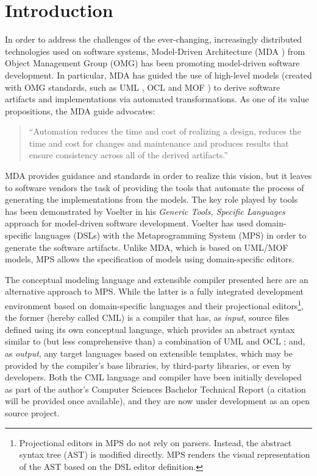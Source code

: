 \section{Introduction}
%
In order to address the challenges of the ever-changing,
increasingly distributed technologies used on software systems,
Model-Driven Architecture (MDA \cite{mda}) from Object Management Group (OMG)
has been promoting model-driven software development.
In particular, MDA has guided the use of high-level models (created with OMG standards,
such as UML \cite{uml}, OCL \cite{ocl} and MOF \cite{mof}) to derive software artifacts and implementations via automated transformations.
As one of its value propositions, the MDA guide \cite{mda} advocates:

\begin{quote}``Automation reduces the time and cost of realizing a design,
reduces the time and cost for changes and maintenance and produces results that ensure consistency across all of the derived artifacts.''\end{quote}

MDA provides guidance and standards in order to realize this vision,
but it leaves to software vendors the task of providing the tools that automate the process of generating the implementations from the models.
The key role played by tools has been demonstrated by Voelter \cite{voelter} in his \emph{Generic Tools, Specific Languages} approach for model-driven software development.
Voelter \cite{voelter} has used domain-specific languages (DSLs) with the Metaprogramming System (MPS) in order to generate the software artifacts.
Unlike MDA, which is based on UML/MOF models,
MPS allows the specification of models using domain-specific editors.

The conceptual modeling language and extensible compiler presented here are an alternative approach to MPS.
While the latter is a fully integrated development environment based on domain-specific languages and their projectional editors\footnote{Projectional
editors in MPS do not rely on parsers.
Instead, the abstract syntax tree (AST) is modified directly.
MPS renders the visual representation of the AST based on the DSL editor definition.},
the former (hereby called CML) is a compiler that has,
as \emph{input}, source files defined using its own conceptual language,
which provides an abstract syntax similar to (but less comprehensive than) a combination of UML \cite{uml} and OCL \cite{ocl};
and, as \emph{output}, any target languages based on extensible templates,
which may be provided by the compiler's base libraries, by third-party libraries, or even by developers. Both the CML language and compiler have been initially developed as part of the author's Computer Sciences Bachelor Technical Report (a citation will be provided once available),
and they are now under development \cite{cml-repo} as an open source project.


